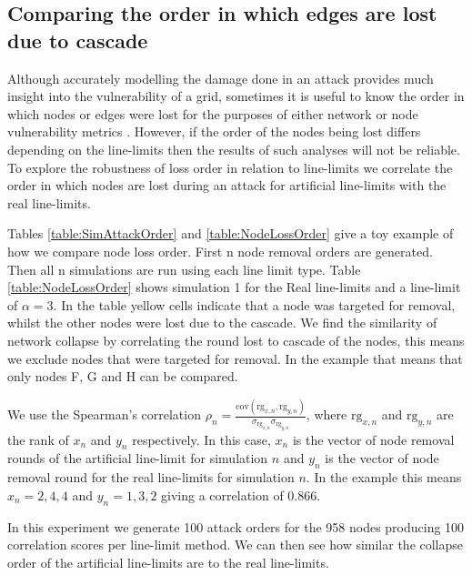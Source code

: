 \documentclass{article}
\begin{document}
\subsection{Comparing the order in which edges are lost due to cascade}
Although accurately modelling the damage done in an attack provides much insight into the vulnerability of a grid, sometimes it is useful to know the order in which nodes or edges were lost for the purposes of either network or node vulnerability metrics \cite{Yang, Hines2017, Zhu2014}. However, if the order of the nodes being lost differs depending on the line-limits then the results of such analyses will not be reliable. To explore the robustness of loss order in relation to line-limits we correlate the order in which nodes are lost during an attack for artificial line-limits with the real line-limits.

Tables \ref{table:SimAttackOrder} and \ref{table:NodeLossOrder} give a toy example of how we compare node loss order. First n node removal orders are generated. Then all n simulations are run using each line limit type. Table \ref{table:NodeLossOrder} shows simulation 1 for the Real line-limits and a line-limit of $\alpha = 3$. In the table yellow cells indicate that a node was targeted for removal, whilst the other nodes were lost due to the cascade. We find the similarity of network collapse by correlating the round lost to cascade of the nodes, this means we exclude nodes that were targeted for removal. In the example that means that only nodes F, G and H can be compared.

We use the Spearman's correlation $\rho_n = \frac{\text{cov}(\text{rg}_{x,n},\text{rg}_{y,n})}{\sigma_{\text{rg}_{x,n}}\sigma_{\text{rg}_{y,n}}}$, where $\text{rg}_{x,n}$ and $\text{rg}_{y,n}$ are the rank of $x_n$ and $y_n$ respectively. In this case, $x_n$ is the vector of node removal rounds of the artificial line-limit for simulation $n$ and $y_n$ is the vector of node removal round for the real line-limits for simulation $n$. In the example this means $x_n = {2,4,4}$ and $y_n = {1,3,2}$ giving a correlation of 0.866. 

In this experiment we generate 100 attack orders for the 958 nodes producing 100 correlation scores per line-limit method. We can then see how similar the collapse order of the artificial line-limits are to the real line-limits.
\end{document}
